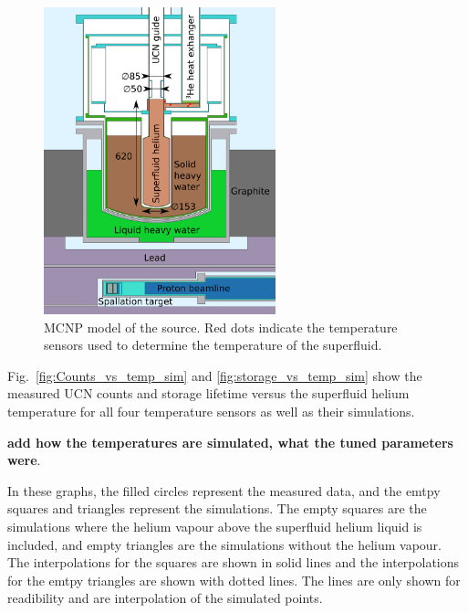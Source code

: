 \begin{figure}[h!]
  \centering
  \includegraphics[width=0.6\textwidth]{MCNPmodel.pdf}
  \caption{MCNP model of the source. Red dots indicate the temperature
    sensors used to determine the temperature of the superfluid.}
  \label{fig:mcnpmodel}
\end{figure}


Fig.~\ref{fig:Counts_vs_temp_sim} and \ref{fig:storage_vs_temp_sim}
show the measured UCN counts and storage lifetime versus the
superfluid helium temperature for all four temperature sensors as well
as their simulations.


{\bf{add how the temperatures are
    simulated, what the tuned parameters were}}.




In these graphs, the filled circles represent the
measured data, and the emtpy squares and triangles represent the
simulations.  The empty squares are the simulations where the helium
vapour above the superfluid helium liquid is included, and empty
triangles are the simulations without the helium vapour. The
interpolations for the squares are shown in solid lines and the
interpolations for the emtpy triangles are shown with dotted
lines. The lines are only shown for readibility and are interpolation
of the simulated points.



